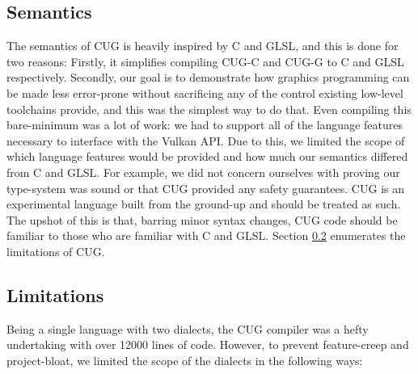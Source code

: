 \documentclass[a4paper,12pt,twoside,openright]{report}
\def\compilerloccount{12000 }
\begin{document}

\subsection{Semantics}

The semantics of CUG is heavily inspired by C and GLSL, and this is done for
two reasons: Firstly, it simplifies compiling CUG-C and CUG-G to C and GLSL
respectively. Secondly, our goal is to demonstrate how graphics programming can
be made less error-prone without sacrificing any of the control existing
low-level toolchains provide, and this was the simplest way to do that. Even
compiling this bare-minimum was a lot of work: we had to support all of the
language features necessary to interface with the Vulkan API. Due to this, we
limited the scope of which language features would be provided and how much our
semantics differed from C and GLSL. For example, we did not concern ourselves
with proving our type-system was sound or that CUG provided any safety
guarantees. CUG is an experimental language built from the ground-up and should
be treated as such. The upshot of this is that, barring minor syntax changes,
CUG code should be familiar to those who are familiar with C and GLSL. Section
\ref{subsec:limitations} enumerates the limitations of CUG.

\subsection{Limitations}

\label{subsec:limitations}

Being a single language with two dialects, the CUG compiler was a hefty
undertaking with over \compilerloccount lines of code. However, to prevent
feature-creep and project-bloat, we limited the scope of the dialects in the
following ways:
\end{document}
